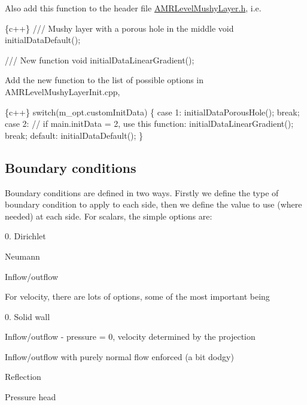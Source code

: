 \begin{DoxyEnumerate}
\item Also add this function to the header file {\ttfamily \hyperlink{_a_m_r_level_mushy_layer_8_h_source}{A\+M\+R\+Level\+Mushy\+Layer.\+h}}, i.\+e. 
\begin{DoxyCode}
\{c++\}
/// Mushy layer with a porous hole in the middle
  void initialDataDefault();

  /// New function
  void initialDataLinearGradient();
\end{DoxyCode}

\item Add the new function to the list of possible options in {\ttfamily A\+M\+R\+Level\+Mushy\+Layer\+Init.\+cpp},
\end{DoxyEnumerate}


\begin{DoxyCode}
\{c++\}
switch(m\_opt.customInitData)
    \{
      case 1:
        initialDataPorousHole();
        break;
      case 2:   // if main.initData = 2, use this function:
         initialDataLinearGradient();
         break; 
      default:
        initialDataDefault();
    \}
\end{DoxyCode}


\subsection*{Boundary conditions}

Boundary conditions are defined in two ways. Firstly we define the type of boundary condition to apply to each side, then we define the value to use (where needed) at each side. For scalars, the simple options are\+:

0. Dirichlet
\begin{DoxyEnumerate}
\item Neumann
\item Inflow/outflow
\end{DoxyEnumerate}

For velocity, there are lots of options, some of the most important being

0. Solid wall
\begin{DoxyEnumerate}
\item Inflow/outflow -\/ pressure = 0, velocity determined by the projection
\item Inflow/outflow with purely normal flow enforced (a bit dodgy)
\item Reflection
\item Pressure head
\end{DoxyEnumerate}

